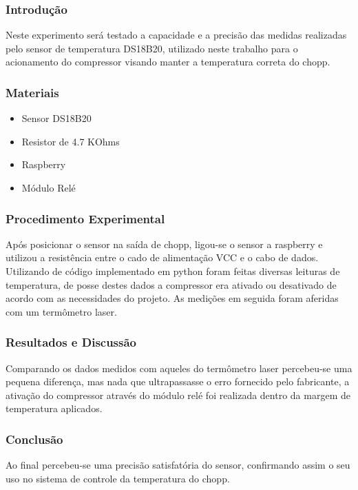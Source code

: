 \subsubsection{Introdução}
    Neste experimento será testado a capacidade e a precisão das medidas realizadas pelo sensor de temperatura DS18B20, utilizado neste trabalho para o acionamento do compressor visando manter a temperatura correta do chopp.

\subsubsection{Materiais}
\begin{itemize}
     \item Sensor DS18B20
     \item Resistor de 4.7 KOhms
     \item Raspberry
     \item Módulo Relé
         
\end{itemize}

\subsubsection{Procedimento Experimental}
     Após posicionar o sensor na saída de chopp, ligou-se o sensor a raspberry e utilizou a resistência entre o cado de alimentação VCC e o cabo de dados. Utilizando de código implementado em python foram feitas diversas leituras de temperatura, de posse destes dados a compressor era ativado ou desativado de acordo com as necessidades do projeto. As medições em seguida foram aferidas com um termômetro laser.
\subsubsection{Resultados e Discussão}
     Comparando os dados medidos com aqueles do termômetro laser percebeu-se uma pequena diferença, mas nada que ultrapassasse o erro fornecido pelo fabricante, a ativação do compressor através do módulo relé foi realizada dentro da margem de temperatura aplicados.
\subsubsection{Conclusão}
     Ao final percebeu-se uma precisão satisfatória do sensor, confirmando assim o seu uso no sistema de controle da temperatura do chopp.



